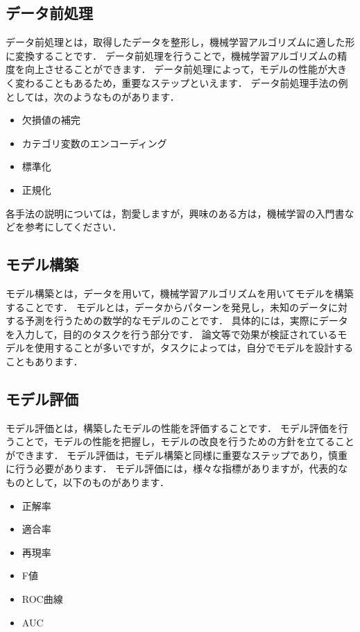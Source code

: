 \documentclass{jarticle}
\begin{document}
\subsection{データ前処理}
データ前処理とは，取得したデータを整形し，機械学習アルゴリズムに適した形に変換することです．
データ前処理を行うことで，機械学習アルゴリズムの精度を向上させることができます．
データ前処理によって，モデルの性能が大きく変わることもあるため，重要なステップといえます．
データ前処理手法の例としては，次のようなものがあります．

\begin{itemize}
  \item 欠損値の補完
  \item カテゴリ変数のエンコーディング
  \item 標準化
  \item 正規化
\end{itemize}

各手法の説明については，割愛しますが，興味のある方は，機械学習の入門書などを参考にしてください．

\subsection{モデル構築}
モデル構築とは，データを用いて，機械学習アルゴリズムを用いてモデルを構築することです．
モデルとは，データからパターンを発見し，未知のデータに対する予測を行うための数学的なモデルのことです．
具体的には，実際にデータを入力して，目的のタスクを行う部分です．
論文等で効果が検証されているモデルを使用することが多いですが，タスクによっては，自分でモデルを設計することもあります．

\subsection{モデル評価}
モデル評価とは，構築したモデルの性能を評価することです．
モデル評価を行うことで，モデルの性能を把握し，モデルの改良を行うための方針を立てることができます．
モデル評価は，モデル構築と同様に重要なステップであり，慎重に行う必要があります．
モデル評価には，様々な指標がありますが，代表的なものとして，以下のものがあります．
\begin{itemize}
  \item 正解率
  \item 適合率
  \item 再現率
  \item F値
  \item ROC曲線
  \item AUC
\end{itemize}
\end{document}

